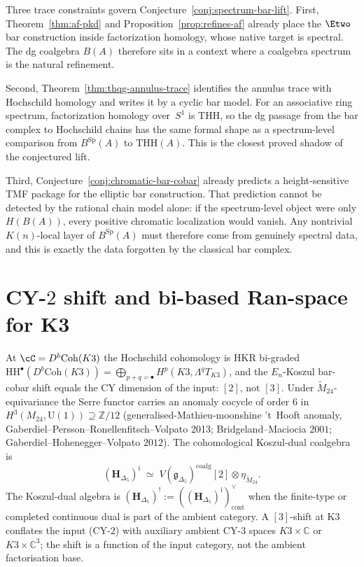 \begin{remark}
\label{rem:spectrum-bar-lift-trace-constraints}
Three trace constraints govern
Conjecture~\ref{conj:spectrum-bar-lift}.
First, Theorem~\ref{thm:af-pkd} and
Proposition~\ref{prop:refines-af} already place the
$\Etwo$ bar construction inside factorization homology, whose native
target is spectral. The dg coalgebra $B(A)$ therefore sits in a
context where a coalgebra spectrum is the natural refinement.

Second, Theorem~\ref{thm:thqg-annulus-trace} identifies the annulus
trace with Hochschild homology and writes it by a cyclic bar model.
For an associative ring spectrum, factorization homology over~$S^1$
is $\mathrm{THH}$, so the dg passage from the bar complex to
Hochschild chains has the same formal shape as a spectrum-level
comparison from $B^{\mathrm{Sp}}(A)$ to $\mathrm{THH}(A)$. This is
the closest proved shadow of the conjectured lift.

Third, Conjecture~\ref{conj:chromatic-bar-cobar} already predicts a
height-sensitive TMF package for the elliptic bar construction. That
prediction cannot be detected by the rational chain model alone: if
the spectrum-level object were only $H(B(A))$, every positive
chromatic localization would vanish. Any nontrivial
$K(n)$-local layer of $B^{\mathrm{Sp}}(A)$ must therefore come from
genuinely spectral data, and this is exactly the data forgotten by
the classical bar complex.
\end{remark}

\section{CY-$2$ shift and bi-based Ran-space for K3}
\label{sec:enkd-supplement}

\begin{remark}
\label{rem:enkd-cy2-shift}
At $\cC = D^b\mathrm{Coh}(K3)$ the Hochschild cohomology is HKR bi-graded
$\mathrm{HH}^\bullet(D^b\mathrm{Coh}(K3)) = \bigoplus_{p+q=\bullet} H^p(K3, \Lambda^q T_{K3})$, and the $E_n$-Koszul bar-cobar shift equals the CY dimension of the input: $[2]$, not $[3]$. Under $\widetilde{M}_{24}$-equivariance the Serre functor carries an anomaly cocycle of order $6$ in $H^3(M_{24},\mathrm{U}(1))\supseteq\mathbb{Z}/12$ (generalised-Mathieu-moonshine 't~Hooft anomaly, Gaberdiel--Persson--Ronellenfitsch--Volpato 2013; Bridgeland--Maciocia $2001$; Gaberdiel--Hohenegger--Volpato $2012$). The cohomological Koszul-dual coalgebra is
\[
 (\mathbf{H}_{\Delta_5})^{\mathrm{i}} \;\simeq\; V(\mathfrak{g}_{\Delta_5})^{\mathrm{coalg}}[2] \otimes \eta_{\widetilde{M}_{24}}.
\]
The Koszul-dual algebra is
$(\mathbf{H}_{\Delta_5})^!:=((\mathbf{H}_{\Delta_5})^{\mathrm{i}})^\vee_{\mathrm{cont}}$
when the finite-type or completed continuous dual is part of the
ambient category.
A $[3]$-shift at K3 conflates the input (CY-$2$) with auxiliary ambient CY-$3$ spaces $K3 \times \mathbb{C}$ or $K3 \times \mathbb{C}^3$; the shift is a function of the input category, not the ambient factorisation base.
\end{remark}

